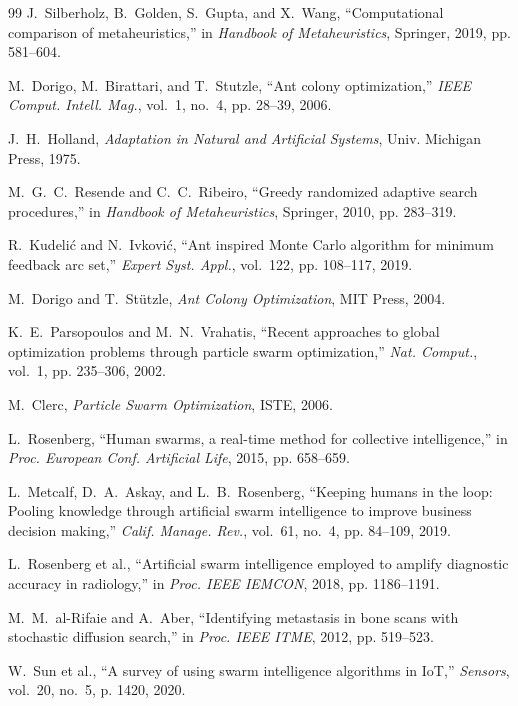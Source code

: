 \documentclass[letterpaper, 10pt, conference]{IEEEtran}
\begin{document}
\begin{thebibliography}{99}
J.~Silberholz, B.~Golden, S.~Gupta, and X.~Wang, ``Computational comparison of metaheuristics,'' in \emph{Handbook of Metaheuristics}, Springer, 2019, pp. 581--604.

M.~Dorigo, M.~Birattari, and T.~Stutzle, ``Ant colony optimization,'' \emph{IEEE Comput. Intell. Mag.}, vol.~1, no.~4, pp. 28--39, 2006.

J.~H.~Holland, \emph{Adaptation in Natural and Artificial Systems}, Univ. Michigan Press, 1975.

M.~G.~C.~Resende and C.~C.~Ribeiro, ``Greedy randomized adaptive search procedures,'' in \emph{Handbook of Metaheuristics}, Springer, 2010, pp. 283--319.

R.~Kudelić and N.~Ivković, ``Ant inspired Monte Carlo algorithm for minimum feedback arc set,'' \emph{Expert Syst. Appl.}, vol.~122, pp. 108--117, 2019.

M.~Dorigo and T.~Stützle, \emph{Ant Colony Optimization}, MIT Press, 2004.

K.~E.~Parsopoulos and M.~N.~Vrahatis, ``Recent approaches to global optimization problems through particle swarm optimization,'' \emph{Nat. Comput.}, vol.~1, pp. 235--306, 2002.

M.~Clerc, \emph{Particle Swarm Optimization}, ISTE, 2006.

L.~Rosenberg, ``Human swarms, a real-time method for collective intelligence,'' in \emph{Proc. European Conf. Artificial Life}, 2015, pp. 658--659.

L.~Metcalf, D.~A.~Askay, and L.~B.~Rosenberg, ``Keeping humans in the loop: Pooling knowledge through artificial swarm intelligence to improve business decision making,'' \emph{Calif. Manage. Rev.}, vol.~61, no.~4, pp. 84--109, 2019.

L.~Rosenberg et al., ``Artificial swarm intelligence employed to amplify diagnostic accuracy in radiology,'' in \emph{Proc. IEEE IEMCON}, 2018, pp. 1186--1191.

M.~M.~al-Rifaie and A.~Aber, ``Identifying metastasis in bone scans with stochastic diffusion search,'' in \emph{Proc. IEEE ITME}, 2012, pp. 519--523.

W.~Sun et al., ``A survey of using swarm intelligence algorithms in {IoT},'' \emph{Sensors}, vol.~20, no.~5, p. 1420, 2020.


\end{thebibliography}
\end{document}

